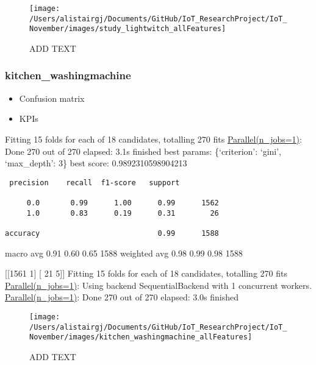 \documentclass[11pt,]{article}
\providecommand{\tightlist}{%
  \setlength{\itemsep}{0pt}\setlength{\parskip}{0pt}}
\begin{document}
\begin{figure}[H]

{\centering \texttt{[image: /Users/alistairgj/Documents/GitHub/IoT\_ResearchProject/IoT\_November/images/study\_lightwitch\_allFeatures]} 

}

\caption{ADD TEXT}\label{fig:unnamed-chunk-11}
\end{figure}

\pagebreak

\hypertarget{kitchen_washingmachine}{%
\subsubsection{kitchen\_washingmachine}\label{kitchen_washingmachine}}

\begin{itemize}
\tightlist
\item
  Confusion matrix
\item
  KPIs
\end{itemize}

Fitting 15 folds for each of 18 candidates, totalling 270 fits
\href{Done\%20270\%20out\%20of\%20270\%20\%7C\%20elapsed:\%202.1s\%20finished}{Parallel(n\_jobs=1)}:
Done 270 out of 270 \textbar{} elapsed: 3.1s finished best params:
\{`criterion': `gini', `max\_depth': 3\} best score: 0.9892310598904213

\begin{verbatim}
 precision    recall  f1-score   support

     0.0       0.99      1.00      0.99      1562
     1.0       0.83      0.19      0.31        26

accuracy                           0.99      1588
\end{verbatim}

macro avg 0.91 0.60 0.65 1588 weighted avg 0.98 0.99 0.98 1588

{[}{[}1561 1{]} {[} 21 5{]}{]} Fitting 15 folds for each of 18
candidates, totalling 270 fits
\href{Done\%20270\%20out\%20of\%20270\%20\%7C\%20elapsed:\%202.1s\%20finished}{Parallel(n\_jobs=1)}:
Using backend SequentialBackend with 1 concurrent workers.
\href{Done\%20270\%20out\%20of\%20270\%20\%7C\%20elapsed:\%202.1s\%20finished}{Parallel(n\_jobs=1)}:
Done 270 out of 270 \textbar{} elapsed: 3.0s finished

\begin{figure}[H]

{\centering \texttt{[image: /Users/alistairgj/Documents/GitHub/IoT\_ResearchProject/IoT\_November/images/kitchen\_washingmachine\_allFeatures]} 

}

\caption{ADD TEXT}\label{fig:unnamed-chunk-12}
\end{figure}
\end{document}
